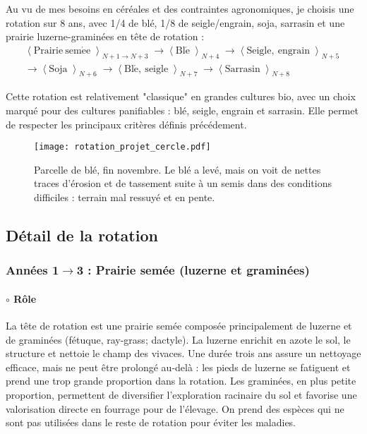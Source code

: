 \documentclass{book}
\begin{document}
Au vu de mes besoins en céréales et des contraintes agronomiques, je choisis une rotation sur 8 ans, avec 1/4 de blé, 1/8 de seigle/engrain, soja, sarrasin et une prairie luzerne-graminées en tête de rotation :
\begin{align*}
\left\langle \right. \mathrm{Prairie\ sem\acute{e}e}  \left\rangle \right._{N+1\rightarrow N+3}  \longrightarrow
\left\langle \right. \mathrm{Bl\acute{e}}  \left\rangle \right._{N+4}  
\longrightarrow
\left\langle \right. \mathrm{Seigle,\ engrain}  \left\rangle \right._{N+5} \\
\longrightarrow 
\left\langle \right.\mathrm{Soja}\left\rangle \right._{N+6}
\longrightarrow
\left\langle \right. \mathrm{Bl\acute{e},\ seigle} \left\rangle \right._{N+7}
\longrightarrow
\left\langle \right. \mathrm{Sarrasin} \left\rangle \right._{N+8}
\end{align*}

Cette rotation est relativement "classique" en grandes cultures bio, avec un choix marqué pour des cultures panifiables : blé, seigle, engrain et sarrasin. Elle permet de respecter les principaux critères définis précédement. 

\begin{figure}[h!]
\begin{center}
	\texttt{[image: rotation\_projet\_cercle.pdf]}
	\caption{Parcelle de blé, fin novembre. Le blé a levé, mais on voit de nettes traces d'érosion et de tassement suite à un semis dans des conditions difficiles : terrain mal ressuyé et en pente.}
\end{center}
\end{figure}

\subsection{Détail de la rotation}

\subsubsection{Années 1$\rightarrow$3 : Prairie semée (luzerne et graminées)}

\paragraph{$\circ$ Rôle} La tête de rotation est une prairie semée composée principalement de luzerne et de graminées (fétuque, ray-grass; dactyle). La luzerne enrichit en azote le sol, le structure et nettoie le champ des vivaces. Une durée trois ans assure un nettoyage efficace, mais ne peut être prolongé au-delà : les pieds de luzerne se fatiguent et prend une trop grande proportion dans la rotation. Les graminées, en plus petite proportion, permettent de diversifier l'exploration racinaire du sol et favorise une valorisation directe en fourrage pour de l'élevage. On prend des espèces qui ne sont pas utilisées dans le reste de rotation pour éviter les maladies.
\end{document}
